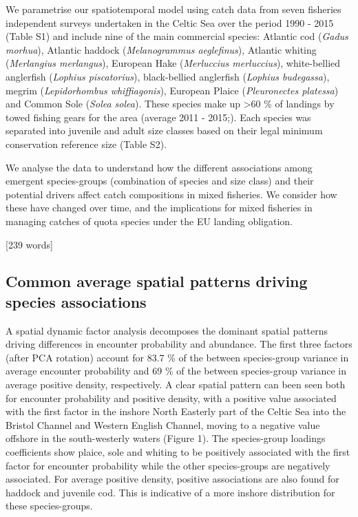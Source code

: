 \documentclass{nature}
\begin{document}
\begin{linenumbers}
We parametrise our spatiotemporal model using catch data from seven fisheries
independent surveys undertaken in the Celtic Sea over the period 1990 - 2015
(Table S1) and include nine of the main commercial species: Atlantic cod
(\textit{Gadus morhua}), Atlantic haddock (\textit{Melanogrammus aeglefinus}),
Atlantic whiting (\textit{Merlangius merlangus}), European Hake
(\textit{Merluccius merluccius}), white-bellied anglerfish (\textit{Lophius
	piscatorius}), black-bellied anglerfish (\textit{Lophius budegassa}),
megrim (\textit{Lepidorhombus whiffiagonis}), European Plaice
(\textit{Pleuronectes platessa}) and Common Sole (\textit{Solea solea}). These
species make up \textgreater 60 \% of landings by towed fishing gears for the
area (average 2011 - 2015;\cite{STECF2017}). Each species was separated into
juvenile and adult size classes based on their legal minimum conservation
reference size (Table S2).

We analyse the data to understand how the different associations among emergent
species-groups (combination of species and size class) and their potential
drivers affect catch compositions in mixed fisheries. We consider how these
have changed over time, and the implications for mixed fisheries in managing
catches of quota species under the EU landing obligation.

[239 words]

\subsection{Common average spatial patterns driving species associations} A
spatial dynamic factor analysis decomposes the dominant spatial patterns
driving differences in encounter probability and abundance. The first three
factors (after PCA rotation) account for 83.7 \% of the between species-group
variance in average encounter probability and 69 \% of the between
species-group variance in average positive density, respectively. A clear
spatial pattern can been seen both for encounter probability and positive
density, with a positive value associated with the first factor in the inshore
North Easterly part of the Celtic Sea into the Bristol Channel and Western
English Channel, moving to a negative value offshore in the south-westerly
waters (Figure 1). The species-group loadings coefficients show plaice, sole
and whiting to be positively associated with the first factor for encounter
probability while the other species-groups are negatively associated. For
average positive density, positive associations are also found for haddock and
juvenile cod. This is indicative of a more inshore distribution for these
species-groups. 


\end{linenumbers}
\end{document}
